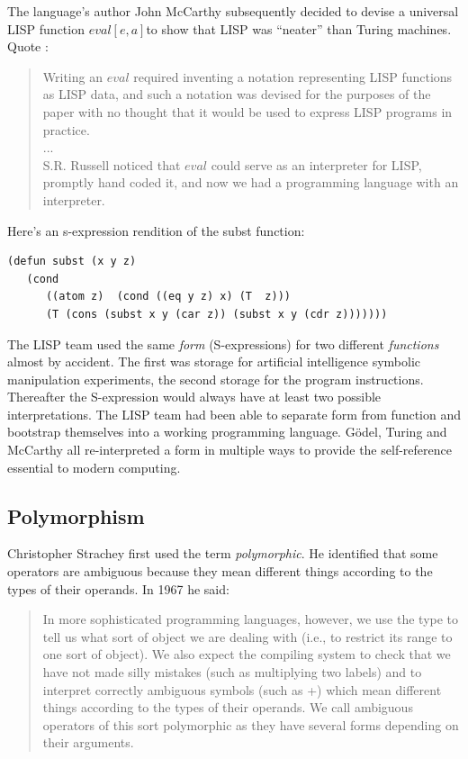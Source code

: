 \documentclass[a4paper,12pt,dvips]{article}
\begin{document}
The language's author John McCarthy subsequently decided to devise a universal LISP function \( eval[e,a] \)to show that LISP was ``neater'' than Turing machines. Quote\cite{LispHist} :
\begin{quote}
Writing an \( eval \) required inventing a notation representing LISP functions as LISP data, and such a notation was devised for the purposes of the paper with no thought that it would be used to express LISP programs in practice.\\
...\\
S.R. Russell noticed that \( eval \) could serve as an interpreter for LISP, promptly hand coded it, and now we had a programming language with an interpreter.
\end{quote}
Here's an s-expression rendition of the subst function:
\begin{verbatim}
(defun subst (x y z)
   (cond
      ((atom z)  (cond ((eq y z) x) (T  z)))
      (T (cons (subst x y (car z)) (subst x y (cdr z)))))))
\end{verbatim}

The LISP team used the same \emph{form} (S-expressions) for two different \emph{functions} almost by accident. The first was storage for artificial intelligence symbolic manipulation experiments, the second storage for the program instructions. Thereafter the S-expression would always have at least two possible interpretations. The LISP team had been able to separate form from function and bootstrap themselves into a working programming language. G\"odel, Turing and McCarthy all re-interpreted a form in multiple ways to provide the self-reference essential to modern computing. 

\subsection{Polymorphism}
Christopher Strachey first used the term \emph{polymorphic}. \cite{strachey} He identified that some operators are ambiguous because they mean different things according to the types of their operands. In 1967 he said: 
\begin{quote}
In more sophisticated programming languages, however, we use the type to tell us what
sort of object we are dealing with (i.e., to restrict its range to one sort of object). We
also expect the compiling system to check that we have not made silly mistakes (such as
multiplying two labels) and to interpret correctly ambiguous symbols (such as +) which
mean different things according to the types of their operands. We call ambiguous operators
of this sort polymorphic as they have several forms depending on their arguments.\end{quote}
\end{document}

